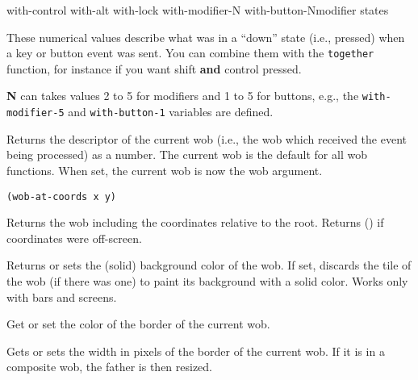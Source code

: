         {with-control}
        {with-alt}
        {with-lock}
        {with-modifier-N}
        {with-button-N}{modifier states}
        

These numerical values describe what was in a ``down'' state (i.e., pressed)
when a key or button event was sent. You can combine them with the
\verb"together" function, for instance if you want shift {\bf and} control 
pressed.

{\bf N} can takes values 2 to 5 for modifiers and 1 to 5 for buttons, e.g.,
the \verb"with-modifier-5" and \verb"with-button-1" variables are defined.

        

Returns the descriptor of the current wob (i.e., the wob which received the
event being processed) as a {\WOOL} number.  The current wob is the default for
all wob functions.  When set, the current wob is now the wob argument.


{\usagefont\begin{verbatim}
(wob-at-coords x y)
\end{verbatim}}\usageupspace

Returns the wob including the coordinates relative to the root. Returns () if
coordinates were off-screen.

        

Returns or sets the (solid) background color of the wob. If set, discards the
tile of the wob (if there was one) to paint its background with a solid color.
Works only with bars and screens.

        

Get or set the color of the border of the current wob.

        

Gets or sets the width in pixels of the border of the current wob.  If it is in
a composite wob, the father is then resized.

